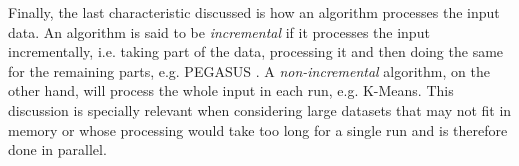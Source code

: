 Finally, the last characteristic discussed is how an algorithm processes the input data.
An algorithm is said to be \emph{incremental} if it processes the input incrementally, i.e. taking part of the data, processing it and then doing the same for the remaining parts, e.g. PEGASUS \cite{Kang2011}.
A \emph{non-incremental} algorithm, on the other hand, will process the whole input in each run, e.g. K-Means.
This discussion is specially relevant when considering large datasets that may not fit in memory or whose processing would take too long for a single run and is therefore done in parallel.








